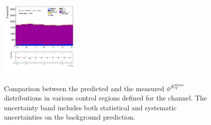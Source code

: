 \begin{figure}[!htp]
\begin{center}
			\includegraphics[width=0.35\textwidth]{chapters/chapter6_HPlus/images/taulep/met_phi_SS_TAUMU.png} \\
			\end{center}
			\caption{
			Comparison between the predicted and the measured $\phi^{E_\text{T}^\text{miss}}$ distributions in various control regions defined for the \taulep channel. The uncertainty band includes both statistical and systematic uncertainties on the background prediction. 
			}
			\label{fig:bkg-met-phi-taulep}
		\end{figure}


		\clearpage
